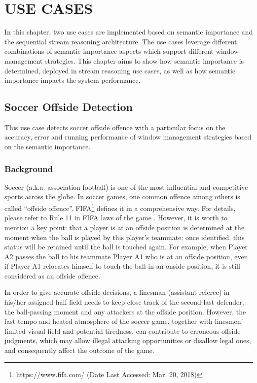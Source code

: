 
\chapter{USE CASES}
In this chapter, two use cases are implemented based on semantic importance and the sequential stream reasoning architecture.
The use cases leverage different combinations of semantic importance aspects which support different window management strategies.
This chapter aims to show how semantic importance is determined, deployed in stream reasoning use cases, as well as how semantic importance impacts the system performance. 
%
\section{Soccer Offside Detection}
This use case detects soccer offside offence with a particular focus on the accuracy, error and running performance of window management strategies based on the semantic importance.
%
\subsection{Background}
Soccer (a.k.a. association football) is one of the most influential and competitive sports across the globe. 
In soccer games, one common offence among others is called ``offside offence''. 
FIFA\footnote{https://www.fifa.com/ (Date Last Accessed: Mar. 20, 2018)} defines it in a comprehensive way.
For details, please refer to Rule 11 in FIFA laws of the game \cite{federation2016laws}.
However, it is worth to mention a key point: that a player is at an offside position is determined at the moment when the ball is played by this player's teammate; once identified, this status will be retained until the ball is touched again. 
For example, when Player A2 passes the ball to his teammate Player A1 who is at an offside position, even if Player A1 relocates himself to touch the ball in an onside position, it is still considered as an offside offence. 

In order to give accurate offside decisions, a linesman (assistant referee) in his/her assigned half field needs to keep close track of the second-last defender, the ball-passing moment and any attackers at the offside position.
However, the fast tempo and heated atmosphere of the soccer game, together with linesmen' limited visual field and potential tiredness, can contribute to erroneous offside judgments, which may allow illegal attacking opportunities or disallow legal ones, and consequently affect the outcome of the game.

